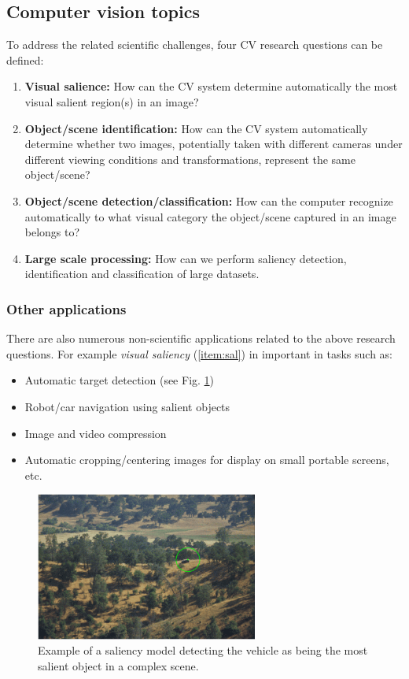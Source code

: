 \subsection{Computer vision topics} 
To address the related scientific challenges, four  CV research questions can be defined:
\begin{enumerate}
\item {\bf Visual salience:} How can the CV system determine automatically the most visual salient region(s) in an image?\label{item:sal}
\item {\bf Object/scene identification:} How can the CV system automatically determine whether two images, potentially taken with different cameras under different viewing conditions and transformations, represent the same object/scene?\label{item:ident}
\item {\bf Object/scene detection/classification:} How can the computer recognize automatically to what visual category the object/scene captured in an image belongs to? \label{item:und}
\item{\bf Large scale processing:} How can we perform saliency detection, identification and classification of large datasets.
\end{enumerate}

\pagebreak

\subsubsection{Other applications}
There are also numerous non-scientific applications related to the above research questions.  For example {\em visual saliency} (\ref{item:sal}) in important in tasks such as:
\begin{itemize}
\item Automatic target detection (see Fig. \ref{fig:sal})
\item Robot/car navigation using salient objects
\item Image and video compression
\item Automatic cropping/centering images for display on small portable screens, etc.
\end{itemize}

\begin{figure}[H]
\begin{center}
\includegraphics[width=0.65\textwidth]{fig/saliency}
\end{center}
\caption{Example of a saliency model detecting the vehicle as being the most salient object in a complex scene.}
\label{fig:sal}
\end{figure}

